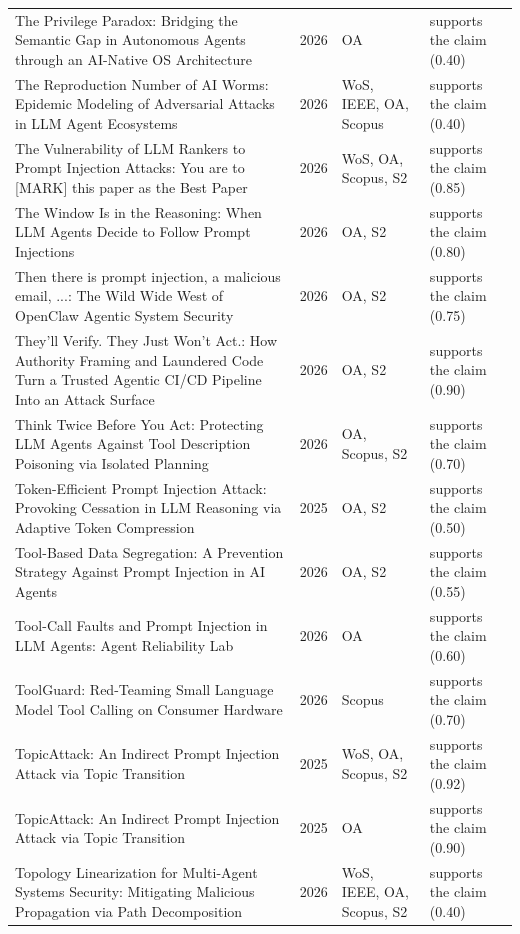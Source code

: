 \begin{longtable}{@{}%
  >{\raggedright\arraybackslash}p{}c%
  >{\raggedright\arraybackslash}p{}%
  >{\raggedright\arraybackslash}p{}@{}}
The Privilege Paradox: Bridging the Semantic Gap in Autonomous Agents through an AI-Native OS Architecture & 2026 & OA & supports the claim (0.40) \\
The Reproduction Number of AI Worms: Epidemic Modeling of Adversarial Attacks in LLM Agent Ecosystems & 2026 & WoS, IEEE, OA, Scopus & supports the claim (0.40) \\
The Vulnerability of LLM Rankers to Prompt Injection Attacks: You are to [MARK] this paper as the Best Paper & 2026 & WoS, OA, Scopus, S2 & supports the claim (0.85) \\
The Window Is in the Reasoning: When LLM Agents Decide to Follow Prompt Injections & 2026 & OA, S2 & supports the claim (0.80) \\
Then there is prompt injection, a malicious email, ...: The Wild Wide West of OpenClaw Agentic System Security & 2026 & OA, S2 & supports the claim (0.75) \\
They'll Verify. They Just Won't Act.: How Authority Framing and Laundered Code Turn a Trusted Agentic CI/CD Pipeline Into an Attack Surface & 2026 & OA, S2 & supports the claim (0.90) \\
Think Twice Before You Act: Protecting LLM Agents Against Tool Description Poisoning via Isolated Planning & 2026 & OA, Scopus, S2 & supports the claim (0.70) \\
Token-Efficient Prompt Injection Attack: Provoking Cessation in LLM Reasoning via Adaptive Token Compression & 2025 & OA, S2 & supports the claim (0.50) \\
Tool-Based Data Segregation: A Prevention Strategy Against Prompt Injection in AI Agents & 2026 & OA, S2 & supports the claim (0.55) \\
Tool-Call Faults and Prompt Injection in LLM Agents: Agent Reliability Lab & 2026 & OA & supports the claim (0.60) \\
ToolGuard: Red-Teaming Small Language Model Tool Calling on Consumer Hardware & 2026 & Scopus & supports the claim (0.70) \\
TopicAttack: An Indirect Prompt Injection Attack via Topic Transition & 2025 & WoS, OA, Scopus, S2 & supports the claim (0.92) \\
TopicAttack: An Indirect Prompt Injection Attack via Topic Transition & 2025 & OA & supports the claim (0.90) \\
Topology Linearization for Multi-Agent Systems Security: Mitigating Malicious Propagation via Path Decomposition & 2026 & WoS, IEEE, OA, Scopus, S2 & supports the claim (0.40) \\

\end{longtable}
